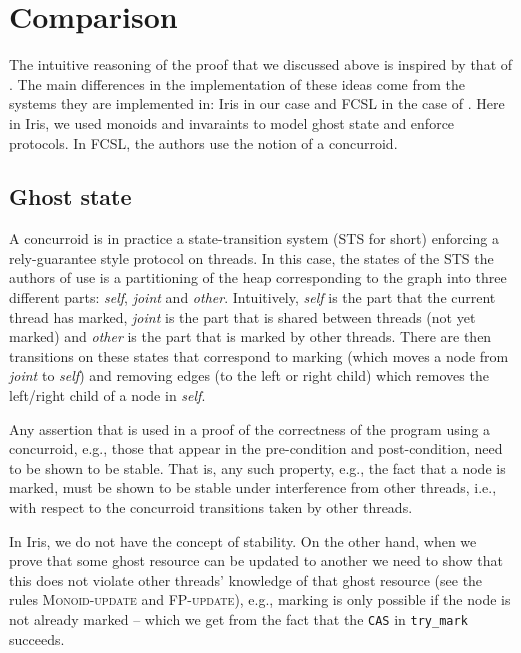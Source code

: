\documentclass[]{scrartcl}
\def\MyMLe{\lstinline[language=MyML, basicstyle=\small\ttfamily, mathescape=true]}
\begin{document}
\section{Comparison}
The intuitive reasoning of the proof that we discussed above is inspired by that of \cite{Sergey:2015:MVF:2737924.2737964}.
The main differences in the implementation of these ideas come from the
systems they are implemented in: Iris in our case and FCSL in the case of
\cite{Sergey:2015:MVF:2737924.2737964}.
Here in Iris, we used monoids and invaraints to model ghost state and
enforce protocols.
In FCSL, the authors use the notion of a concurroid.

\subsection{Ghost state}
A concurroid is in practice a state-transition system (STS for short)
enforcing a rely-guarantee style protocol on threads.
In this case, the states of the STS the authors of \cite{Sergey:2015:MVF:2737924.2737964} use is a partitioning of the
heap corresponding to the graph into three different parts:
\textit{self}, \textit{joint} and \textit{other}.
Intuitively, \textit{self} is the part that the current thread has marked,
\textit{joint} is the part that is shared between threads (not yet marked)
and \textit{other} is the part that is marked by other threads.
There are then transitions on these states that correspond to marking
(which moves a node from \textit{joint} to \textit{self}) and removing
edges (to the left or right child) which removes the left/right child of a
node in \textit{self}.

Any assertion that is used in a proof of the correctness of the program
using a concurroid, e.g., those that appear in the pre-condition and post-condition,
need to be shown to be stable.
That is, any such property, e.g., the fact that a node is marked, must be
shown to be stable under interference from other threads, i.e., with
respect to the concurroid transitions taken by other threads.

In Iris, we do not have the concept of stability.
On the other hand, when we prove that some ghost resource can be
updated to another we need to show that this does not violate other
threads' knowledge of that ghost resource
(see the rules \textsc{Monoid-update} and \textsc{FP-update}), e.g., marking is only possible
if the node is not already marked -- which we get from the fact that the \MyMLe|CAS| in \MyMLe|try_mark| succeeds.
\end{document}
